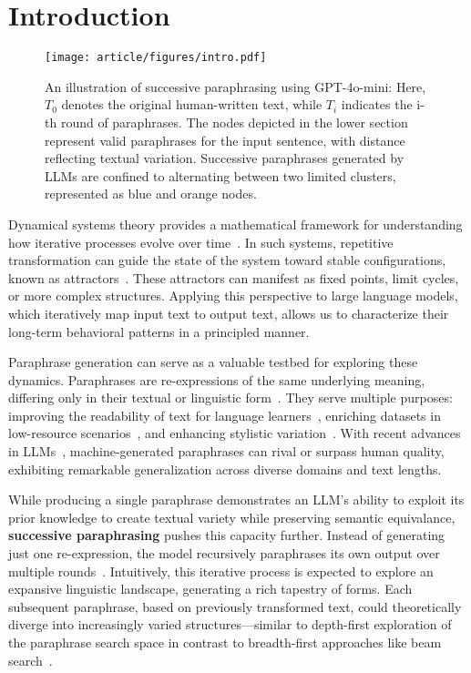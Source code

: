 \section{Introduction}



\begin{figure}[t!]
    \centering
    \texttt{[image: article/figures/intro.pdf]}
    \caption{An illustration of successive paraphrasing using GPT-4o-mini: Here, $T_0$ denotes the original human-written text, while $T_i$ indicates the i-th round of paraphrases. The nodes depicted in the lower section represent valid paraphrases for the input sentence, with distance reflecting textual variation. Successive paraphrases generated by LLMs are confined to alternating between two limited clusters, represented as blue and orange nodes.} 
    \label{figs:intro}
\end{figure}

Dynamical systems theory provides a mathematical framework for understanding how iterative processes evolve over time~\cite{system1,system2}. 
In such systems, repetitive transformation can guide the state of the system toward stable configurations, known as attractors~\cite{attractor1}. 
These attractors can manifest as fixed points, limit cycles, or more complex structures. 
Applying this perspective to large language models, which iteratively map input text to output text, allows us to characterize their long-term behavioral patterns in a principled manner.

Paraphrase generation can serve as a valuable testbed for exploring these dynamics. 
Paraphrases are re-expressions of the same underlying meaning, differing only in their textual or linguistic form~\cite{bhagat_what_2013}. 
They serve multiple purposes: improving the readability of text for language learners~\cite{motlagh_impact_nodate,roe_what_2022,kim_how_2024}, enriching datasets in low-resource scenarios~\cite{okur_data_2022,sobrevilla_cabezudo_investigating_2024}, and enhancing stylistic variation~\cite{krishna-etal-2020-reformulating}. 
With recent advances in LLMs~\cite{touvron2023llama2openfoundation,alpaca,gpt3,gpt4}, machine-generated paraphrases can rival or surpass human quality, exhibiting remarkable generalization across diverse domains and text lengths.



While producing a single paraphrase demonstrates an LLM’s ability to exploit its prior knowledge to create textual variety while preserving semantic equivalance, \textbf{successive paraphrasing} pushes this capacity further. 
Instead of generating just one re-expression, the model recursively paraphrases its own output over multiple rounds~\cite{can_ai,ship}. 
Intuitively, this iterative process is expected to explore an expansive linguistic landscape, generating a rich tapestry of forms. Each subsequent paraphrase, based on previously transformed text, could theoretically diverge into increasingly varied structures—similar to depth-first exploration of the paraphrase search space in contrast to breadth-first approaches like beam search~\cite{Holtzman2020The,huang-etal-2023-affective,meister-etal-2023-locally}.



